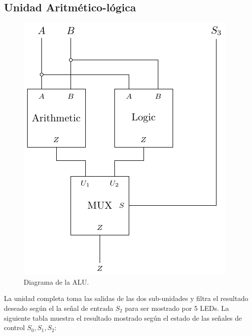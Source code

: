 \documentclass[journal, table]{IEEEtran}
\begin{document}
\subsection{Unidad Aritmético-lógica}
\begin{figure}[H]
    \centering
    \includegraphics[width=\linewidth]{./Images/alu.pdf}
    \caption{Diagrama de la ALU.}
    \label{fig:alu-diagram}
\end{figure}

La unidad completa toma las salidas de las dos sub-unidades y filtra el resultado deseado según el la señal de entrada $S_2$ para ser mostrado por 5 LEDs. La siguiente tabla muestra el resultado mostrado según el estado de las señales de control $S_0, S_1, S_2$:
\end{document}
